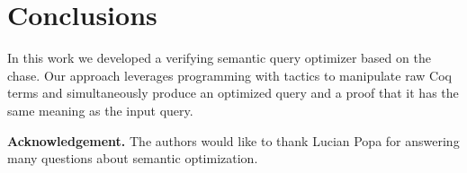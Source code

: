 \documentclass[preprint]{sigplanconf}
\begin{document}
\section{Conclusions}

In this work we developed a verifying semantic query optimizer based on the chase.
Our approach leverages programming with tactics to manipulate raw Coq terms and simultaneously produce an optimized query and a proof that it has the same meaning as the input query.





{\bf Acknowledgement.}  The authors would like to thank Lucian Popa for answering many questions about semantic optimization.



\end{document}
